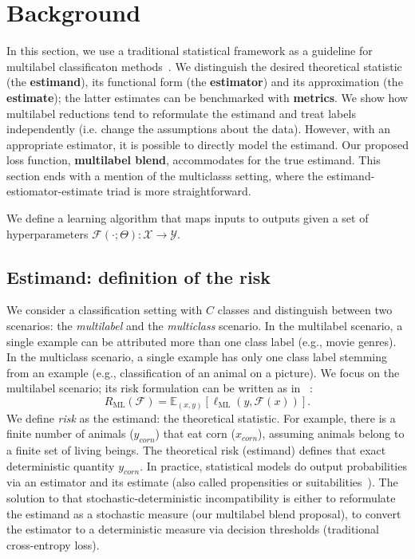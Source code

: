 
\section{Background}
\label{section:background}

In this section, we use a traditional statistical framework as a guideline for multilabel classificaton methods~\citep{tukey}. We distinguish the desired theoretical statistic (the \textbf{estimand}), its functional form (the \textbf{estimator}) and its approximation (the \textbf{estimate}); the latter estimates can be benchmarked with \textbf{metrics}. We show how multilabel reductions tend to reformulate the estimand and treat labels independently (i.e. change the assumptions about the data). However, with an appropriate estimator, it is possible to directly model the estimand. Our proposed loss function, \textbf{multilabel blend}, accommodates for the true estimand. This section ends with a mention of the multiclasss setting, where the estimand-estiomator-estimate triad is more straightforward.

We define a learning algorithm that maps inputs to outputs given a set of hyperparameters \(\mathcal{F}(\cdot ; \Theta): \mathcal{X} \rightarrow \mathcal{Y}\). 

\subsection{Estimand: definition of the risk}
\label{section:background:estimand}

We consider a classification setting with $C$ classes and distinguish between two scenarios: the \emph{multilabel} and the \emph{multiclass} scenario. 
In the multilabel scenario, a single example can be attributed more than one class label (e.g., movie genres). 
In the multiclass scenario, a single example has only one class label stemming from an example (e.g., classification of an animal on a picture). 
We focus on the multilabel scenario; its risk formulation can be written as in ~\citep{multilabelReduction}:
%
\begin{equation}
R_{\mathrm{ML}}(\mathcal{F}) = \mathbb{E}_{(x, y)}\left[\ell_{\mathrm{ML}}(y, \mathcal{F}(x))\right].
\end{equation}
%
We define \emph{risk} as the estimand: the theoretical statistic. For example, there is a finite number of animals ($y_{corn}$) that eat corn ($x_{corn}$), assuming animals belong to a finite set of living beings. The theoretical risk (estimand) defines that exact deterministic quantity $y_{corn}$. In practice, statistical models do output probabilities via an estimator and its estimate (also called propensities or suitabilities~\citep{multilabelReduction}). The solution to that stochastic-deterministic incompatibility is either to reformulate the estimand as a stochastic measure (our multilabel blend proposal), to convert the estimator to a deterministic measure via decision thresholds (traditional cross-entropy loss).

